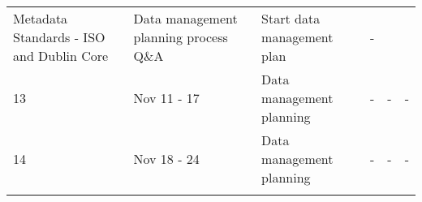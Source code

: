\documentclass[
]{article}
\begin{document}
\begin{longtable}[]{@{}llllll@{}}
\begin{minipage}[t]{0.18\columnwidth}
Metadata Standards - ISO and Dublin Core\strut
\end{minipage} & \begin{minipage}[t]{0.18\columnwidth}\raggedright
Data management planning process Q\&A\strut
\end{minipage} & \begin{minipage}[t]{0.14\columnwidth}\raggedright
Start data management plan\strut
\end{minipage} & \begin{minipage}[t]{0.17\columnwidth}\raggedright
-\strut
\end{minipage}\tabularnewline
\begin{minipage}[t]{0.05\columnwidth}\raggedright
13\strut
\end{minipage} & \begin{minipage}[t]{0.11\columnwidth}\raggedright
Nov 11 - 17\strut
\end{minipage} & \begin{minipage}[t]{0.18\columnwidth}\raggedright
Data management planning\strut
\end{minipage} & \begin{minipage}[t]{0.18\columnwidth}\raggedright
-\strut
\end{minipage} & \begin{minipage}[t]{0.14\columnwidth}\raggedright
-\strut
\end{minipage} & \begin{minipage}[t]{0.17\columnwidth}\raggedright
-\strut
\end{minipage}\tabularnewline
\begin{minipage}[t]{0.05\columnwidth}\raggedright
14\strut
\end{minipage} & \begin{minipage}[t]{0.11\columnwidth}\raggedright
Nov 18 - 24\strut
\end{minipage} & \begin{minipage}[t]{0.18\columnwidth}\raggedright
Data management planning\strut
\end{minipage} & \begin{minipage}[t]{0.18\columnwidth}\raggedright
-\strut
\end{minipage} & \begin{minipage}[t]{0.14\columnwidth}\raggedright
-\strut
\end{minipage} & \begin{minipage}[t]{0.17\columnwidth}\raggedright
-\strut
\end{minipage}\tabularnewline
\begin{minipage}[t]{0.05\columnwidth}\raggedright

\end{minipage}
\end{longtable}
\end{document}
